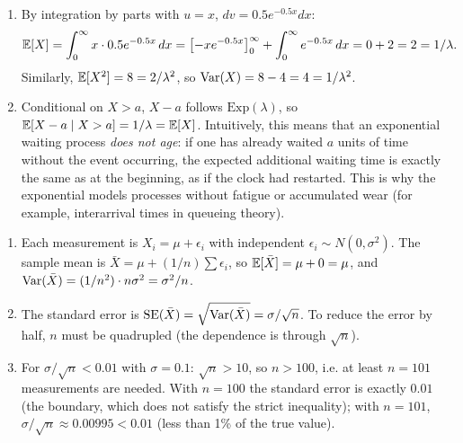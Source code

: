 \begin{solproblema}[prob:f43c638]
	\begin{enumerate}
		\item By integration by parts with $u=x$, $dv=0.5e^{-0.5x}dx$:
		\begin{align*}
			\mathbb{E}[X] = \int_{0}^{\infty} x \cdot 0.5 e^{-0.5x}\,dx = \left[-xe^{-0.5x}\right]_0^\infty + \int_0^\infty e^{-0.5x}\,dx = 0+2 = 2 = 1/\lambda.
		\end{align*}
		Similarly, $\mathbb{E}[X^2] = 8 = 2/\lambda^2$, so $\operatorname{Var}(X) = 8-4=4=1/\lambda^2$.
		\item Conditional on $X>a$, $X-a$ follows $\text{Exp}(\lambda)$, so $\mathbb{E}[X-a\mid X>a] = 1/\lambda = \mathbb{E}[X]$. Intuitively, this means that an exponential waiting process \emph{does not age}: if one has already waited $a$ units of time without the event occurring, the expected additional waiting time is exactly the same as at the beginning, as if the clock had restarted. This is why the exponential models processes without fatigue or accumulated wear (for example, interarrival times in queueing theory).
	\end{enumerate}
\end{solproblema}

\begin{solproblema}[prob:7b147c4]
	\begin{enumerate}
		\item Each measurement is $X_i=\mu+\epsilon_i$ with independent $\epsilon_i\sim N(0,\sigma^2)$. The sample mean is $\bar{X}=\mu+(1/n)\sum\epsilon_i$, so $\mathbb{E}[\bar{X}]=\mu+0=\mu$, and $\operatorname{Var}(\bar{X})=(1/n^2)\cdot n\sigma^2=\sigma^2/n$.
		\item The standard error is $\text{SE}(\bar{X})=\sqrt{\operatorname{Var}(\bar{X})}=\sigma/\sqrt{n}$. To reduce the error by half, $n$ must be quadrupled (the dependence is through $\sqrt{n}$).
		\item For $\sigma/\sqrt{n}<0.01$ with $\sigma=0.1$: $\sqrt{n}>10$, so $n>100$, i.e. at least $n=101$ measurements are needed. With $n=100$ the standard error is exactly $0.01$ (the boundary, which does not satisfy the strict inequality); with $n=101$, $\sigma/\sqrt{n}\approx0.00995<0.01$ (less than 1\% of the true value).
	\end{enumerate}
\end{solproblema}

